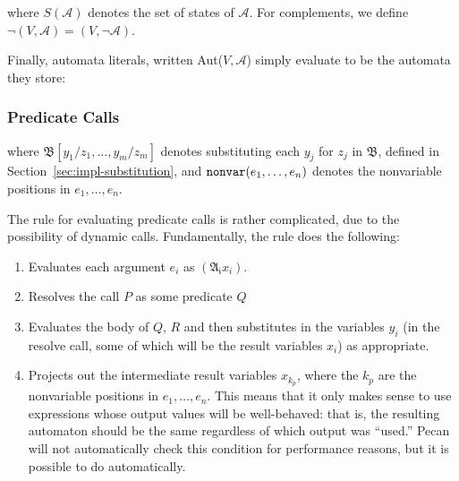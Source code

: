 where $S(\mathcal{A})$ denotes the set of states of $\mathcal{A}$.
For complements, we define $\lnot (V, \mathcal{A}) = (V, \lnot \mathcal{A})$.

Finally, automata literals, written Aut($V, \mathcal{A}$) simply evaluate to be the automata they store:
\begin{mathpar}


\end{mathpar}

\subsubsection{Predicate Calls}

\begin{mathpar}
\end{mathpar}

where $\mathfrak{B}[y_1 / z_1, \ldots, y_m / z_m]$ denotes substituting each $y_j$ for $z_j$ in $\mathfrak{B}$, defined in Section~\ref{sec:impl-substitution}, and $\nonvar(e_1, \ldots, e_n)$ denotes the nonvariable positions in $e_1, \ldots, e_n$.

The rule for evaluating predicate calls is rather complicated, due to the possibility of dynamic calls.
Fundamentally, the rule does the following:

\begin{enumerate}
    \item Evaluates each argument $e_i$ as $(\mathfrak{A_i} x_i)$.
    \item Resolves the call $P$ as some predicate $Q$
    \item Evaluates the body of $Q$, $R$ and then substitutes in the variables $y_i$ (in the resolve call, some of which will be the result variables $x_i$) as appropriate.
    \item Projects out the intermediate result variables $x_{k_p}$, where the $k_p$ are the nonvariable positions in $e_1, \ldots, e_n$.
        This means that it only makes sense to use expressions whose output values will be well-behaved: that is, the resulting automaton should be the same regardless of which output was ``used.''
        Pecan will not automatically check this condition for performance reasons, but it is possible to do automatically.
\end{enumerate}

